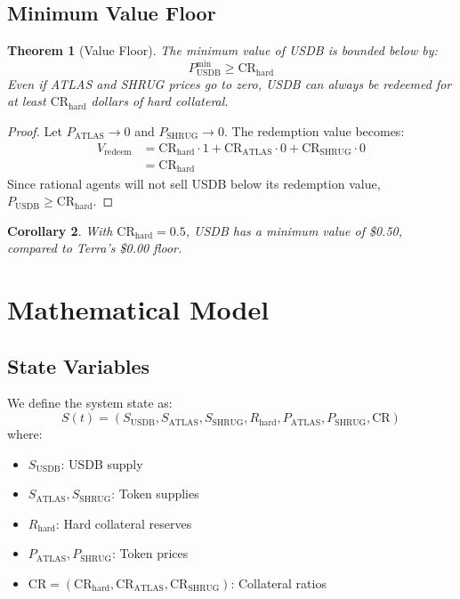 \documentclass[11pt,a4paper]{article}
\newtheorem{theorem}{Theorem}[section]
\newtheorem{corollary}[theorem]{Corollary}
\begin{document}
\subsection{Minimum Value Floor}

\begin{theorem}[Value Floor]
The minimum value of USDB is bounded below by:
\begin{equation}
P_{\text{USDB}}^{\min} \geq \text{CR}_{\text{hard}}
\end{equation}
Even if ATLAS and SHRUG prices go to zero, USDB can always be redeemed for at least $\text{CR}_{\text{hard}}$ dollars of hard collateral.
\end{theorem}

\begin{proof}
Let $P_{\text{ATLAS}} \to 0$ and $P_{\text{SHRUG}} \to 0$. The redemption value becomes:
\begin{align}
V_{\text{redeem}} &= \text{CR}_{\text{hard}} \cdot 1 + \text{CR}_{\text{ATLAS}} \cdot 0 + \text{CR}_{\text{SHRUG}} \cdot 0 \\
&= \text{CR}_{\text{hard}}
\end{align}
Since rational agents will not sell USDB below its redemption value, $P_{\text{USDB}} \geq \text{CR}_{\text{hard}}$.
\end{proof}

\begin{corollary}
With $\text{CR}_{\text{hard}} = 0.5$, USDB has a minimum value of \$0.50, compared to Terra's \$0.00 floor.
\end{corollary}

\section{Mathematical Model}
\label{sec:mathmodel}

\subsection{State Variables}

We define the system state as:
\begin{equation}
S(t) = (S_{\text{USDB}}, S_{\text{ATLAS}}, S_{\text{SHRUG}}, R_{\text{hard}}, P_{\text{ATLAS}}, P_{\text{SHRUG}}, \text{CR})
\end{equation}
where:
\begin{itemize}
    \item $S_{\text{USDB}}$: USDB supply
    \item $S_{\text{ATLAS}}, S_{\text{SHRUG}}$: Token supplies
    \item $R_{\text{hard}}$: Hard collateral reserves
    \item $P_{\text{ATLAS}}, P_{\text{SHRUG}}$: Token prices
    \item $\text{CR} = (\text{CR}_{\text{hard}}, \text{CR}_{\text{ATLAS}}, \text{CR}_{\text{SHRUG}})$: Collateral ratios
\end{itemize}
\end{document}
